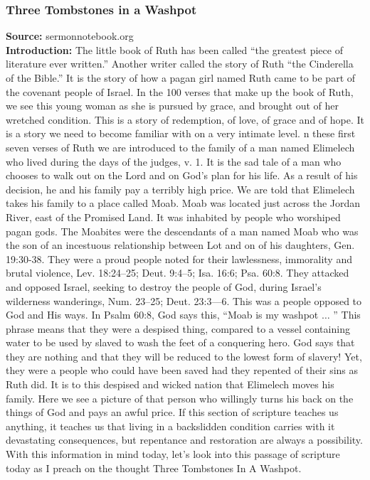 \subsubsection{Three Tombstones in a Washpot}
\textbf{Source: }sermonnotebook.org\\
\textbf{Introduction: }The little book of Ruth has been called ``the greatest piece of literature ever written.'' Another writer called the story of Ruth ``the Cinderella of the Bible.'' It is the story of how a pagan girl named Ruth came to be part of the covenant people of Israel. In the 100 verses that make up the book of Ruth, we see this young woman as she is pursued by grace, and brought out of her wretched condition. This is a story of redemption, of love, of grace and of hope. It is a story we need to become familiar with on a very intimate level.  n these first seven verses of Ruth we are introduced to the family of a man named Elimelech who lived during the days of the judges, v. 1. It is the sad tale of a man who chooses to walk out on the Lord and on God's plan for his life. As a result of his decision, he and his family pay a terribly high price. We are told that Elimelech takes his family to a place called Moab. Moab was located just across the Jordan River, east of the Promised Land. It was inhabited by people who worshiped pagan gods. The Moabites were the descendants of a man named Moab who was the son of an incestuous relationship between Lot and on of his daughters, Gen. 19:30-38. They were a proud people noted for their lawlessness, immorality and brutal violence, Lev. 18:24--25; Deut. 9:4--5; Isa. 16:6; Psa. 60:8. They attacked and opposed Israel, seeking to destroy the people of God, during Israel's wilderness wanderings, Num. 23--25; Deut. 23:3---6. This was a people opposed to God and His ways. In Psalm 60:8, God says this, ``Moab is my washpot $\hdots$ '' This phrase means that they were a despised thing, compared to a vessel containing water to be used by slaved to wash the feet of a conquering hero. God says that they are nothing and that they will be reduced to the lowest form of slavery! Yet, they were a people who could have been saved had they repented of their sins as Ruth did. It is to this despised and wicked nation that Elimelech moves his family. Here we see a picture of that person who willingly turns his back on the things of God and pays an awful price. If this section of scripture teaches us anything, it teaches us that living in a backslidden condition carries with it devastating consequences, but repentance and restoration are always a possibility. With this information in mind today, let's look into this passage of scripture today as I preach on the thought Three Tombstones In A Washpot.
